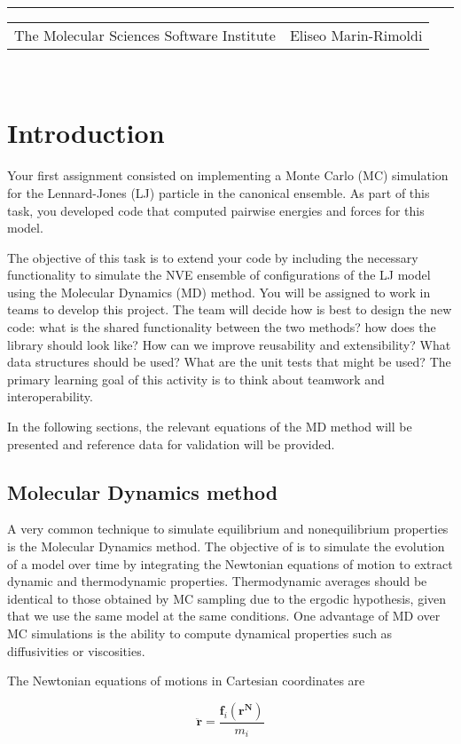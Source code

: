 \documentclass[aip,jcp,preprint,superscriptaddress,floatfix]{revtex4-1}
\renewcommand{\title}[1]{\textbf{\large{#1}}\\}
\newcommand{\leftright}[2]{\begin{tabularx}{\textwidth}{X>{\raggedleft}X}#1%
& #2\\\end{tabularx}\\[-1cm]}
\begin{document}
\title{ }
\rule{\textwidth}{1pt}
\leftright{The Molecular Sciences Software Institute}{Eliseo Marin-Rimoldi} %

\bigskip

\section{Introduction}

Your first assignment consisted on implementing a Monte Carlo (MC) simulation
for the Lennard-Jones (LJ) particle in the canonical ensemble. 
As part of this task,
you developed code that computed pairwise energies and forces for this model.

The objective of this task is to extend your code by including the
necessary functionality to simulate the NVE ensemble of configurations 
of the LJ model using the Molecular Dynamics (MD) method. You will be 
assigned to work in teams to develop this project. The team will
decide how is best to design the new code: what is the shared functionality
between the two methods? how does the library should look like? How can
we improve reusability and extensibility? What data
structures should be used? What are the unit tests 
that might be used? The primary learning goal of this activity 
is to think about teamwork and interoperability.

In the following sections, the relevant equations of the MD 
method will be presented and reference data for validation will be provided.

\subsection{Molecular Dynamics method}

A very common technique to simulate equilibrium and nonequilibrium
properties is the Molecular Dynamics method. 
The objective of is to simulate the evolution of a model over time
by integrating the Newtonian equations of motion to 
extract dynamic and thermodynamic properties. Thermodynamic
averages should be identical to those obtained by MC sampling
due to the ergodic hypothesis, given that we use the same model at the
same conditions. One advantage of MD over MC simulations is 
the ability to compute dynamical properties such as diffusivities or 
viscosities. 

The Newtonian equations of motions in Cartesian coordinates are

\begin{equation}
	\ddot{\mathbf{r}} = \frac{\mathbf{f}_i\left( \mathbf{r^N} \right) }{\textit{m}_i}
\end{equation}
\end{document}

